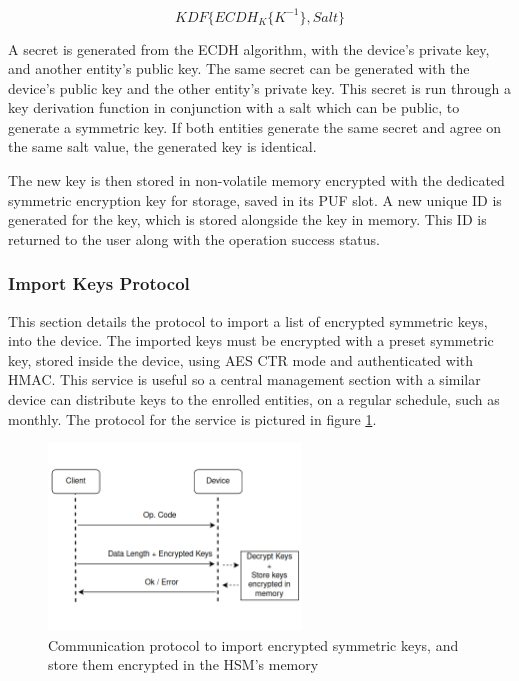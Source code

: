 \begin{equation}
	\label{eq:ecdh-kdf}
	KDF\{ECDH_{K}\{K^{-1}\}, Salt\}
\end{equation}

A secret is generated from the \ac{ECDH} algorithm, with the device's private key, and another entity's public key. The same secret can be generated with the device's public key and the other entity's private key. 
This secret is run through a key derivation function in conjunction with a salt which can be public, to generate a symmetric key. If both entities generate the same secret and agree on the same salt value, the generated key is identical.

The new key is then stored in non-volatile memory encrypted with the dedicated symmetric encryption key for storage, saved in its PUF slot.
A new unique ID is generated for the key, which is stored alongside the key in memory. This ID is returned to the user along with the operation success status.

\subsubsection{Import Keys Protocol}\label{chap:arch:services:new-comms:import}

This section details the protocol to import a list of encrypted symmetric keys, into the device.
The imported keys must be encrypted with a preset symmetric key, stored inside the device, using \ac{AES} \ac{CTR} mode and authenticated with \ac{HMAC}. This service is useful so a central management section with a similar device can distribute keys to the enrolled entities, on a regular schedule, such as monthly.
The protocol for the service is pictured in figure \ref{fig:protocol:import-keys}.

\begin{figure}[h!]
	\centering
	\includegraphics[width=0.60\textwidth]{./Images/import-keys.png}
	\caption{Communication protocol to import encrypted symmetric keys, and store them encrypted in the HSM's memory}
	\label{fig:protocol:import-keys}
\end{figure}

